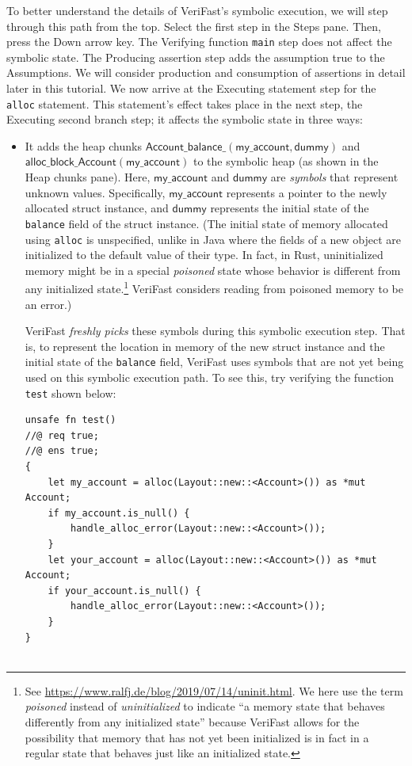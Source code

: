 \documentclass{article}
\begin{document}
To better understand the details of VeriFast's symbolic execution, we will step through this path from the top. Select the first step in the Steps pane. Then, press the Down arrow key. The \textsf{Verifying function \lstinline|main|} step does not affect the symbolic state. The \textsf{Producing assertion} step adds the assumption \textsf{true} to the Assumptions. We will consider production and consumption of assertions in detail later in this tutorial. We now arrive at the \textsf{Executing statement} step for the \lstinline|alloc| statement. This statement's effect takes place in the next step, the \textsf{Executing second branch} step; it affects the symbolic state in three ways:
\begin{itemize}
\item It adds the heap chunks $\mathsf{Account\_balance\_}(\mathsf{my\_account}, \mathsf{dummy})$ and $\mathsf{alloc\_block\_Account}(\mathsf{my\_account})$ to the symbolic heap (as shown in the Heap chunks pane). Here, $\mathsf{my\_account}$ and $\mathsf{dummy}$ are \emph{symbols} that represent unknown values. Specifically, $\mathsf{my\_account}$ represents a pointer to the newly allocated struct instance, and $\mathsf{dummy}$ represents the initial state of the \lstinline|balance| field of the struct instance. (The initial state of memory allocated using \lstinline|alloc| is unspecified, unlike in Java where the fields of a new object are initialized to the default value of their type. In fact, in Rust, uninitialized memory might be in a special \emph{poisoned} state whose behavior is different from any initialized state.\footnote{See \url{https://www.ralfj.de/blog/2019/07/14/uninit.html}. We here use the term \emph{poisoned} instead of \emph{uninitialized} to indicate ``a memory state that behaves differently from any initialized state'' because VeriFast allows for the possibility that memory that has not yet been initialized is in fact in a regular state that behaves just like an initialized state.} VeriFast considers reading from poisoned memory to be an error.)

VeriFast \emph{freshly picks} these symbols during this symbolic execution step. That is, to represent the location in memory of the new struct instance and the initial state of the \lstinline|balance| field, VeriFast uses symbols that are not yet being used on this symbolic execution path. To see this, try verifying the function \lstinline|test| shown below:
\begin{lstlisting}
unsafe fn test()
//@ req true;
//@ ens true;
{
    let my_account = alloc(Layout::new::<Account>()) as *mut Account;
    if my_account.is_null() {
        handle_alloc_error(Layout::new::<Account>());
    }
    let your_account = alloc(Layout::new::<Account>()) as *mut Account;
    if your_account.is_null() {
        handle_alloc_error(Layout::new::<Account>());
    }
}


\end{lstlisting}
\end{itemize}
\end{document}
